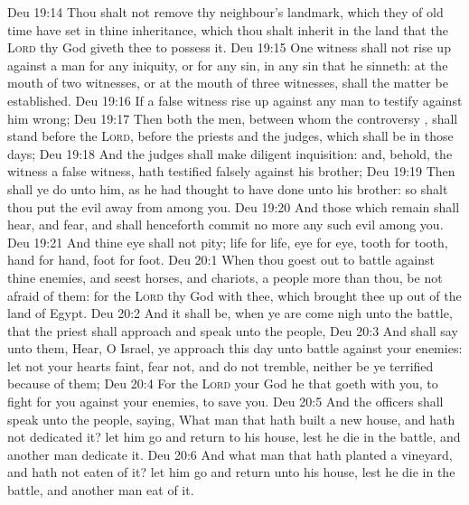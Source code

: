 \vs Deu 19:14 Thou shalt not remove thy neighbour's landmark, which they of old time have set in thine inheritance, which thou shalt inherit in the land that the \textsc{Lord} thy God giveth thee to possess it.
\vs Deu 19:15 One witness shall not rise up against a man for any iniquity, or for any sin, in any sin that he sinneth: at the mouth of two witnesses, or at the mouth of three witnesses, shall the matter be established.
\vs Deu 19:16 If a false witness rise up against any man to testify against him  wrong;
\vs Deu 19:17 Then both the men, between whom the controversy , shall stand before the \textsc{Lord}, before the priests and the judges, which shall be in those days;
\vs Deu 19:18 And the judges shall make diligent inquisition: and, behold,  the witness  a false witness,  hath testified falsely against his brother;
\vs Deu 19:19 Then shall ye do unto him, as he had thought to have done unto his brother: so shalt thou put the evil away from among you.
\vs Deu 19:20 And those which remain shall hear, and fear, and shall henceforth commit no more any such evil among you.
\vs Deu 19:21 And thine eye shall not pity;  life  for life, eye for eye, tooth for tooth, hand for hand, foot for foot.
\vs Deu 20:1 When thou goest out to battle against thine enemies, and seest horses, and chariots,  a people more than thou, be not afraid of them: for the \textsc{Lord} thy God  with thee, which brought thee up out of the land of Egypt.
\vs Deu 20:2 And it shall be, when ye are come nigh unto the battle, that the priest shall approach and speak unto the people,
\vs Deu 20:3 And shall say unto them, Hear, O Israel, ye approach this day unto battle against your enemies: let not your hearts faint, fear not, and do not tremble, neither be ye terrified because of them;
\vs Deu 20:4 For the \textsc{Lord} your God  he that goeth with you, to fight for you against your enemies, to save you.
\vs Deu 20:5 And the officers shall speak unto the people, saying, What man  that hath built a new house, and hath not dedicated it? let him go and return to his house, lest he die in the battle, and another man dedicate it.
\vs Deu 20:6 And what man  that hath planted a vineyard, and hath not  eaten of it? let him  go and return unto his house, lest he die in the battle, and another man eat of it.
